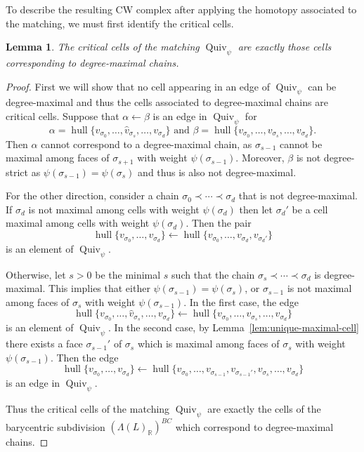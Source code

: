 \documentclass{amsart}
\newcommand{\RR}{\mathbb{R}}
\newcommand{\Quiv}{\operatorname{Quiv}}
\DeclareMathOperator{\hull}{hull}
\newtheorem{lemma}[theorem]{Lemma}
\theoremstyle{remark}
\begin{document}
To describe the resulting CW complex after applying the homotopy associated to the matching, we must first identify the critical cells.

\begin{lemma}
  \label{lem:critical-cells}
  The critical cells of the matching $\Quiv_\psi$ are exactly those cells corresponding to degree-maximal chains.
\end{lemma}
\begin{proof}
  First we will show that no cell appearing in an edge of $\Quiv_\psi$ can be degree-maximal and thus the cells associated to degree-maximal chains are critical cells. Suppose that $\alpha\leftarrow \beta$ is an edge in $\Quiv_\psi$ for  \[\alpha=\hull\{v_{\sigma_0},\ldots,\widehat{v}_{\sigma_s},\ldots,v_{\sigma_d}\}\text{ and } \beta=\hull\{v_{\sigma_0},\ldots,v_{\sigma_s},\ldots,v_{\sigma_{d}}\}.\]
  Then $\alpha$ cannot correspond to a degree-maximal chain, as $\sigma_{s-1}$ cannot be maximal among faces of $\sigma_{s+1}$ with weight $\psi(\sigma_{s-1})$. Moreover, $\beta$ is not degree-strict as $\psi(\sigma_{s-1}) = \psi(\sigma_s)$ and thus is also not degree-maximal.
  
  For the other direction, consider a chain $\sigma_0\prec\cdots\prec\sigma_d$ that is not degree-maximal. If $\sigma_d$ is not maximal among cells with weight $\psi(\sigma_d)$ then let $\sigma_{d}'$ be a cell maximal among cells with weight $\psi(\sigma_d)$. Then the pair
  \[\hull\{v_{\sigma_0},\ldots,v_{\sigma_d}\}\leftarrow \hull\{v_{\sigma_0},\ldots,v_{\sigma_{d}},v_{\sigma_{d}'}\}\]
  is an element of $\Quiv_\psi$.

  Otherwise, let $s>0$ be the minimal $s$ such that the chain $\sigma_s\prec \cdots \prec \sigma_d$ is degree-maximal. This implies that either $\psi(\sigma_{s-1})=\psi(\sigma_{s})$, or $\sigma_{s-1}$ is not maximal among faces of $\sigma_s$ with weight $\psi(\sigma_{s-1})$. In the first case, the edge \[\hull\{v_{\sigma_0},\ldots,\widehat{v}_{\sigma_s},\ldots,v_{\sigma_d}\}\leftarrow \hull\{v_{\sigma_0},\ldots,v_{\sigma_s},\ldots,v_{\sigma_{d}}\}\]
  is an element of $\Quiv_\psi$. In the second case, by Lemma~\ref{lem:unique-maximal-cell} there exists a face $\sigma_{s-1}'$ of $\sigma_s$ which is maximal among faces of $\sigma_s$ with weight $\psi(\sigma_{s-1})$. Then the edge
  \[\hull\{v_{\sigma_0},\ldots,v_{\sigma_d}\}\leftarrow \hull\{v_{\sigma_0},\ldots,v_{\sigma_{s-1}},v_{\sigma_{s-1}'},v_{\sigma_s},\ldots,v_{\sigma_{d}}\}\]
  is an edge in $\Quiv_\psi$.

  Thus the critical cells of the matching $\Quiv_\psi$ are exactly the cells of the barycentric subdivision $(\Lambda(L)_{\RR})^{BC}$ which correspond to degree-maximal chains.
\end{proof}
\end{document}
